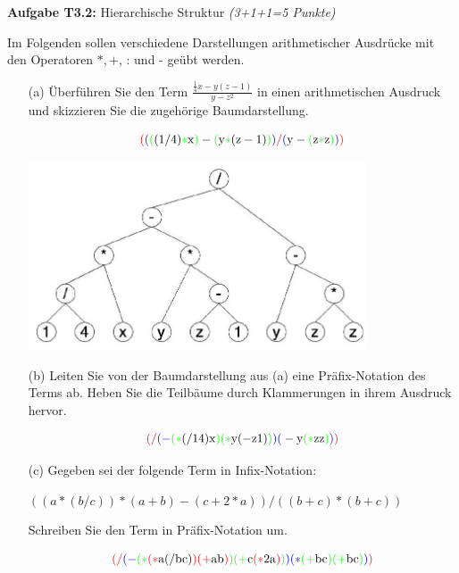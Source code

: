 \textbf{Aufgabe T3.2:} Hierarchische Struktur \textit{(3+1+1=5 Punkte)} 

Im Folgenden sollen verschiedene Darstellungen arithmetischer Ausdrücke mit den Operatoren $*,+$, : und - geübt werden.

\begin{itemize}
  \item [(a)] Überführen Sie den Term $\frac{\frac{1}{4} x-y(z-1)}{y-z^{2}}$ in einen arithmetischen Ausdruck und skizzieren Sie die zugehörige Baumdarstellung.
  
  $$
  \textcolor{red}{(}\textcolor{blue}{(}\textcolor{green}{(}(1 / 4) \textcolor{green}{*} \mathrm{x}\textcolor{green}{)}-\textcolor{green}{(}\mathrm{y} \textcolor{green}{*}(\mathrm{z}-1)\textcolor{green}{)}\textcolor{blue}{)} \textcolor{red}{/}\textcolor{blue}{(}\mathrm{y}-\textcolor{green}{(}\mathrm{z} \textcolor{green}{*} \mathrm{z}\textcolor{green}{)}\textcolor{blue}{)}\textcolor{red}{)}
  $$
  
  \begin{center}
  \includegraphics[width=10cm]{2023_01_23_87b3ed9af9e71cf7f31ag-1}
  \end{center}
  
  \item [(b)] Leiten Sie von der Baumdarstellung aus (a) eine Präfix-Notation des Terms ab. Heben Sie die Teilbäume durch Klammerungen in ihrem Ausdruck hervor.
  
  $$
  \textcolor{red}{(/}\textcolor{blue}{(-}\textcolor{green}{(*}(/ 14) \mathrm{x}\textcolor{green}{)(*} \mathrm{y}(-\mathrm{z} 1)\textcolor{green}{)}\textcolor{blue}{)(}-\mathrm{y}\textcolor{green}{(*} \mathrm{z} \mathrm{z}\textcolor{green}{)}\textcolor{blue}{)}\textcolor{red}{)}
  $$

  \item [(c)] Gegeben sei der folgende Term in Infix-Notation:
  
  $((a *(b / c)) *(a+b)-(c+2 * a)) /((b+c) *(b+c))$
  
  Schreiben Sie den Term in Präfix-Notation um.

  $$
  \textcolor{red}{(/}\textcolor{blue}{(-}\textcolor{green}{(*}\textcolor{red}{(*} \mathrm{a}(/ \mathrm{b} \mathrm{c})\textcolor{red}{)(+}\mathrm{ab}\textcolor{red}{)}\textcolor{green}{)(+}\mathrm{c}\textcolor{red}{(*} 2 \mathrm{a}\textcolor{red}{)}\textcolor{green}{)}\textcolor{blue}{)(*}\textcolor{green}{(+}\mathrm{bc}\textcolor{green}{)(+}\mathrm{bc}\textcolor{green}{)}\textcolor{blue}{)}\textcolor{red}{)}
  $$
\end{itemize}

